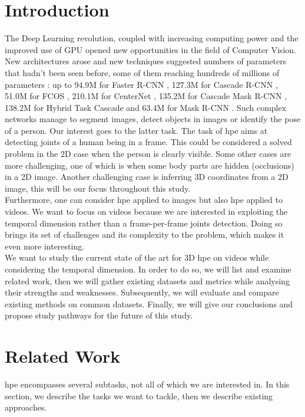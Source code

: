 \documentclass[runningheads]{llncs}
\begin{document}
\section{Introduction}
\label{section: introduction}
The Deep Learning revolution, coupled with increasing computing power and the improved use of GPU opened new opportunities in the field of Computer Vision. New architectures arose and new techniques suggested numbers of parameters that hadn't been seen before, some of them reaching hundreds of millions of parameters \cite{hrnet}: up to 94.9M for Faster R-CNN \cite{R-CNN}, 127.3M for Cascade R-CNN \cite{Cascade R-CNN}, 51.0M for FCOS \cite{FCOS}, 210.1M for CenterNet \cite{CenterNet}, 135.2M for Cascade Mask R-CNN \cite{Cascade R-CNN}, 138.2M for Hybrid Task Cascade \cite{Hybrid Task Cascade} and 63.4M for Mask R-CNN \cite{R-CNN}. Such complex networks manage to segment images, detect objects in images or identify the pose of a person. Our interest goes to the latter task. The task of \ac{hpe} aims at detecting joints of a human being in a frame. This could be considered a solved problem in the 2D case when the person is clearly visible. Some other cases are more challenging, one of which is when some body parts are hidden (occlusions) in a 2D image. Another challenging case is inferring 3D coordinates from a 2D image, this will be our focus throughout this study. \\
Furthermore, one can consider \ac{hpe} applied to images but also \ac{hpe} applied to videos. We want to focus on videos because we are interested in exploiting the temporal dimension rather than a frame-per-frame joints detection. Doing so brings its set of challenges and its complexity to the problem, which makes it even more interesting. \\
We want to study the current state of the art for 3D \ac{hpe} on videos while considering the temporal dimension. In order to do so, we will list and examine related work, then we will gather existing datasets and metrics while analysing their strengths and weaknesses. Subsequently, we will evaluate and compare existing methods on common datasets. Finally, we will give our conclusions and propose study pathways for the future of this study.

\section{Related Work}
\ac{hpe} encompasses several subtasks, not all of which we are interested in. In this section, we describe the tasks we want to tackle, then we describe existing approaches.
\end{document}
